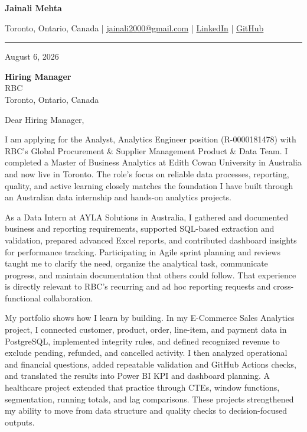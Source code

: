 \documentclass[letterpaper,10pt]{article}
\begin{document}
\begin{center}
  {\fontsize{17}{19}\selectfont\textbf{Jainali Mehta}}\par\vspace{2pt}
  \small Toronto, Ontario, Canada \;|\;
  \href{mailto:jainali2000@gmail.com}{jainali2000@gmail.com} \;|\;
  \href{https://www.linkedin.com/in/jainali-mehta}{LinkedIn} \;|\;
  \href{https://github.com/jainalimehta}{GitHub}
\end{center}
\vspace{-5pt}
\noindent\rule{\textwidth}{0.4pt}

August 6, 2026

\textbf{Hiring Manager}\\
RBC\\
Toronto, Ontario, Canada

Dear Hiring Manager,

I am applying for the Analyst, Analytics Engineer position (R-0000181478) with RBC's Global Procurement \& Supplier Management Product \& Data Team. I completed a Master of Business Analytics at Edith Cowan University in Australia and now live in Toronto. The role's focus on reliable data processes, reporting, quality, and active learning closely matches the foundation I have built through an Australian data internship and hands-on analytics projects.

As a Data Intern at AYLA Solutions in Australia, I gathered and documented business and reporting requirements, supported SQL-based extraction and validation, prepared advanced Excel reports, and contributed dashboard insights for performance tracking. Participating in Agile sprint planning and reviews taught me to clarify the need, organize the analytical task, communicate progress, and maintain documentation that others could follow. That experience is directly relevant to RBC's recurring and ad hoc reporting requests and cross-functional collaboration.

My portfolio shows how I learn by building. In my E-Commerce Sales Analytics project, I connected customer, product, order, line-item, and payment data in PostgreSQL, implemented integrity rules, and defined recognized revenue to exclude pending, refunded, and cancelled activity. I then analyzed operational and financial questions, added repeatable validation and GitHub Actions checks, and translated the results into Power BI KPI and dashboard planning. A healthcare project extended that practice through CTEs, window functions, segmentation, running totals, and lag comparisons. These projects strengthened my ability to move from data structure and quality checks to decision-focused outputs.
\end{document}
